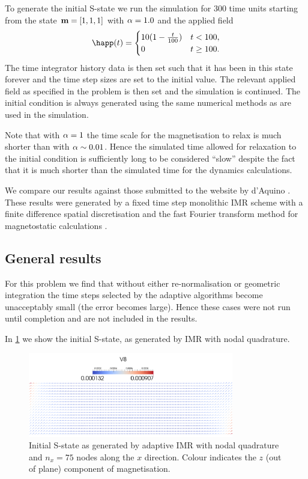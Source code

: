 To generate the initial S-state we run the simulation for 300 time units starting from the state $\boldsymbol{\mathrm{m}}=[1,1,1]$ with $\alpha = 1.0$ and the applied field
\begin{equation}
  \happ(t) =
  \begin{cases}
    10 (1- \frac{t}{100}) & t < 100, \\
    0 & t \geq 100.
  \end{cases}
\end{equation}
The time integrator history data is then set such that it has been in this state forever and the time step sizes are set to the initial value.
The relevant applied field as specified in the problem is then set and the simulation is continued.
The initial condition is always generated using the same numerical methods as are used in the simulation.

Note that with $\alpha = 1$ the time scale for the magnetisation to relax is much shorter than with $\alpha \sim 0.01$.
Hence the simulated time allowed for relaxation to the initial condition is sufficiently long to be considered ``slow'' despite the fact that it is much shorter than the simulated time for the dynamics calculations.


We compare our results against those submitted to the \mumag website by d'Aquino \etal \cite{mumag-website}.
These results were generated by a fixed time step monolithic IMR scheme with a finite difference spatial discretisation and the fast Fourier transform method for magnetostatic calculations \cite{DAquino2005}.



\subsection{General results}

For this problem we find that without either re-normalisation or geometric integration the time steps selected by the adaptive algorithms become unacceptably small (\ie the error becomes large).
Hence these cases were not run until completion and are not included in the results.

In \cref{fig:intial-mumag4} we show the initial S-state, as generated by IMR with nodal quadrature.
\begin{figure}
  \centering
  \includegraphics[width=0.8\textwidth]{images/mumag4-s-state.pdf}
  \caption{Initial S-state as generated by adaptive IMR with nodal quadrature and $n_x=75$ nodes along the $x$ direction.
    Colour indicates the $z$ (out of plane) component of magnetisation.
  }
  \label{fig:intial-mumag4}
\end{figure}

